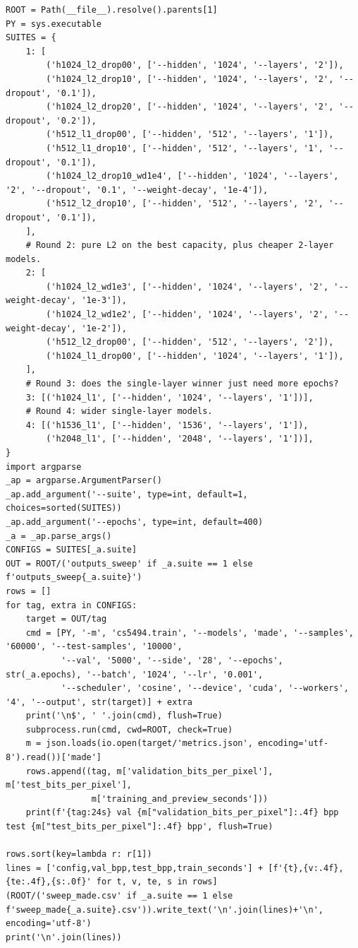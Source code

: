 \begin{lstlisting}
ROOT = Path(__file__).resolve().parents[1]
PY = sys.executable
SUITES = {
    1: [
        ('h1024_l2_drop00', ['--hidden', '1024', '--layers', '2']),
        ('h1024_l2_drop10', ['--hidden', '1024', '--layers', '2', '--dropout', '0.1']),
        ('h1024_l2_drop20', ['--hidden', '1024', '--layers', '2', '--dropout', '0.2']),
        ('h512_l1_drop00', ['--hidden', '512', '--layers', '1']),
        ('h512_l1_drop10', ['--hidden', '512', '--layers', '1', '--dropout', '0.1']),
        ('h1024_l2_drop10_wd1e4', ['--hidden', '1024', '--layers', '2', '--dropout', '0.1', '--weight-decay', '1e-4']),
        ('h512_l2_drop10', ['--hidden', '512', '--layers', '2', '--dropout', '0.1']),
    ],
    # Round 2: pure L2 on the best capacity, plus cheaper 2-layer models.
    2: [
        ('h1024_l2_wd1e3', ['--hidden', '1024', '--layers', '2', '--weight-decay', '1e-3']),
        ('h1024_l2_wd1e2', ['--hidden', '1024', '--layers', '2', '--weight-decay', '1e-2']),
        ('h512_l2_drop00', ['--hidden', '512', '--layers', '2']),
        ('h1024_l1_drop00', ['--hidden', '1024', '--layers', '1']),
    ],
    # Round 3: does the single-layer winner just need more epochs?
    3: [('h1024_l1', ['--hidden', '1024', '--layers', '1'])],
    # Round 4: wider single-layer models.
    4: [('h1536_l1', ['--hidden', '1536', '--layers', '1']),
        ('h2048_l1', ['--hidden', '2048', '--layers', '1'])],
}
import argparse
_ap = argparse.ArgumentParser()
_ap.add_argument('--suite', type=int, default=1, choices=sorted(SUITES))
_ap.add_argument('--epochs', type=int, default=400)
_a = _ap.parse_args()
CONFIGS = SUITES[_a.suite]
OUT = ROOT/('outputs_sweep' if _a.suite == 1 else f'outputs_sweep{_a.suite}')
rows = []
for tag, extra in CONFIGS:
    target = OUT/tag
    cmd = [PY, '-m', 'cs5494.train', '--models', 'made', '--samples', '60000', '--test-samples', '10000',
           '--val', '5000', '--side', '28', '--epochs', str(_a.epochs), '--batch', '1024', '--lr', '0.001',
           '--scheduler', 'cosine', '--device', 'cuda', '--workers', '4', '--output', str(target)] + extra
    print('\n$', ' '.join(cmd), flush=True)
    subprocess.run(cmd, cwd=ROOT, check=True)
    m = json.loads(io.open(target/'metrics.json', encoding='utf-8').read())['made']
    rows.append((tag, m['validation_bits_per_pixel'], m['test_bits_per_pixel'],
                 m['training_and_preview_seconds']))
    print(f'{tag:24s} val {m["validation_bits_per_pixel"]:.4f} bpp  test {m["test_bits_per_pixel"]:.4f} bpp', flush=True)

rows.sort(key=lambda r: r[1])
lines = ['config,val_bpp,test_bpp,train_seconds'] + [f'{t},{v:.4f},{te:.4f},{s:.0f}' for t, v, te, s in rows]
(ROOT/('sweep_made.csv' if _a.suite == 1 else f'sweep_made{_a.suite}.csv')).write_text('\n'.join(lines)+'\n', encoding='utf-8')
print('\n'.join(lines))
\end{lstlisting}

